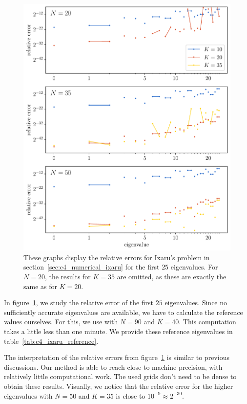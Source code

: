 \begin{figure}
    \begin{center}
        \includegraphics[width=\textwidth]{img/chapter4/nm_test_ixaru.pdf}
    \end{center}
    \caption{These graphs display the relative errors for Ixaru's problem in section~\ref{sec:c4_numerical_ixaru} for the first $25$ eigenvalues. For $N=20$, the results for $K=35$ are omitted, as these are exactly the same as for $K=20$.}
    \label{fig:c4_nm_ixaru_test}
\end{figure}

In figure~\ref{fig:c4_nm_ixaru_test}, we study the relative error of the first $25$ eigenvalues. Since no sufficiently accurate eigenvalues are available, we have to calculate the reference values ourselves. For this, we use \strands{} with $N=90$ and $K=40$. This computation takes a little less than one minute. We provide these reference eigenvalues in table~\ref{tab:c4_ixaru_reference}.

The interpretation of the relative errors from figure~\ref{fig:c4_nm_ixaru_test} is similar to previous discussions. Our method is able to reach close to machine precision, with relatively little computational work. The used grids don't need to be dense to obtain these results. Visually, we notice that the relative error for the higher eigenvalues with $N=50$ and $K=35$ is close to $10^{-9} \approx 2^{-30}$.

